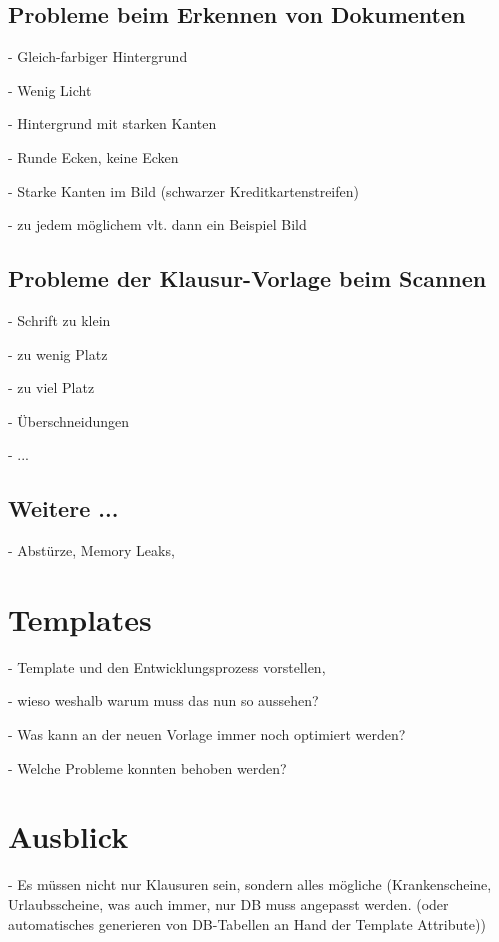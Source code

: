 \documentclass[nomenclature, oneside, 150]{HSMW-Thesis}
\begin{document}
	\section{Probleme beim Erkennen von Dokumenten}
		- Gleich-farbiger Hintergrund
			
		- Wenig Licht
		
		- Hintergrund mit starken Kanten
		
		- Runde Ecken, keine Ecken
		
		- Starke Kanten im Bild (schwarzer Kreditkartenstreifen)
		
		- zu jedem möglichem vlt. dann ein Beispiel Bild
		
	\section{Probleme der Klausur-Vorlage beim Scannen}
		- Schrift zu klein
		
		- zu wenig Platz
		
		- zu viel Platz
		
		- Überschneidungen
		
		- ...
		
	\section{Weitere ...}
		- Abstürze, Memory Leaks, 




\chapter{Templates}
	- Template und den Entwicklungsprozess vorstellen, 
	
	- wieso weshalb warum muss das nun so aussehen?
	
	- Was kann an der neuen Vorlage immer noch optimiert werden?	
	
	- Welche Probleme konnten behoben werden?
	
		
\chapter{Ausblick}
	- Es müssen nicht nur Klausuren sein, sondern alles mögliche (Krankenscheine, Urlaubsscheine, was auch immer, nur DB muss angepasst werden. (oder automatisches generieren von DB-Tabellen an Hand der Template Attribute))
	
\end{document}
